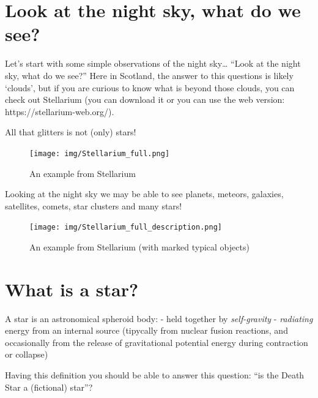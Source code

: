 \documentclass[
  letterpaper,
  DIV=11,
  numbers=noendperiod]{scrreprt}
\begin{document}
\hypertarget{look-at-the-night-sky-what-do-we-see}{%
\chapter{Look at the night sky, what do we
see?}\label{look-at-the-night-sky-what-do-we-see}}

Let's start with some simple observations of the night sky\ldots{}
``Look at the night sky, what do we see?'' Here in Scotland, the answer
to this questions is likely `clouds', but if you are curious to know
what is beyond those clouds, you can check out Stellarium (you can
download it or you can use the web version:
https://stellarium-web.org/).

All that glitters is not (only) stars!

\begin{figure}

{\centering \texttt{[image: img/Stellarium\_full.png]}

}

\caption{An example from Stellarium}

\end{figure}

Looking at the night sky we may be able to see planets, meteors,
galaxies, satellites, comets, star clusters and many stars!

\begin{figure}

{\centering \texttt{[image: img/Stellarium\_full\_description.png]}

}

\caption{An example from Stellarium (with marked typical objects)}

\end{figure}


\hypertarget{what-is-a-star}{%
\chapter{What is a star?}\label{what-is-a-star}}

A star is an astronomical spheroid body: - held together by
\emph{self-gravity} - \emph{radiating} energy from an internal source
(tipycally from nuclear fusion reactions, and occasionally from the
release of gravitational potential energy during contraction or
collapse)

Having this definition you should be able to answer this question: ``is
the Death Star a (fictional) star''?
\end{document}
